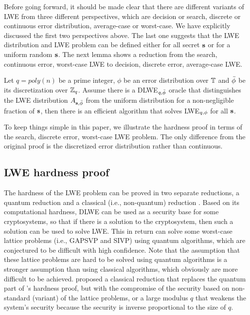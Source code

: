 \documentclass[../main.tex]{subfiles}
\begin{document}
Before going forward, it should be made clear that there are different variants of LWE from three different perspectives, which are decision or search, discrete or continuous error distribution, average-case or worst-case. We have explicitly discussed the first two perspectives above. The last one suggests that the LWE distribution and LWE problem can be defined either for all secret $\mathbf{s}$ or for a uniform random $\mathbf{s}$. The next lemma shows a reduction from the search, continuous error, worst-case LWE to decision, discrete error, average-case LWE.  

\begin{lemma}
Let $q=poly(n)$ be a prime integer, $\phi$ be an error distribution over $\mathbb{T}$ and $\Bar{\phi}$ be its discretization over $\mathbb{Z}_q$. Assume there is a DLWE$_{q,\Bar{\phi}}$ oracle that distinguishes the LWE distribution $A_{\mathbf{s},\Bar{\phi}}$ from the uniform distribution for a non-negligible fraction of $\mathbf{s}$, then there is an efficient algorithm that solves LWE$_{q,\mathbf{\phi}}$ for all $\mathbf{s}$. 
\end{lemma}

To keep things simple in this paper, we illustrate the hardness proof in terms of the search, discrete error, worst-case LWE problem. The only difference from the original proof is the discretized error distribution rather than continuous. 




\subsection{LWE hardness proof}
\label{subsec:lweHardnessProof}

The hardness of the LWE problem can be proved in two separate reductions, a quantum reduction and a classical (i.e., non-quantum) reduction . Based on its computational hardness, DLWE can be used as a security base for some cryptosystems, so that if there is a solution to the cryptosystem, then such a solution can be used to solve LWE. This in return can solve some worst-case lattice problems (i.e., GAPSVP and SIVP) using quantum algorithms, which are conjectured to be difficult with high confidence. Note that the assumption that these lattice problems are hard to be solved using quantum algorithms is a stronger assumption than using classical algorithms, which obviously are more difficult to be achieved. \citep{peikert2009public} proposed a classical reduction that replaces the quantum part of \citep{regev2009lattices}'s hardness proof, but with the compromise of the security based on non-standard (variant) of the lattice problems, or a large modulus $q$ that weakens the system's security because the security is inverse proportional to the size of $q$. 
\end{document}
